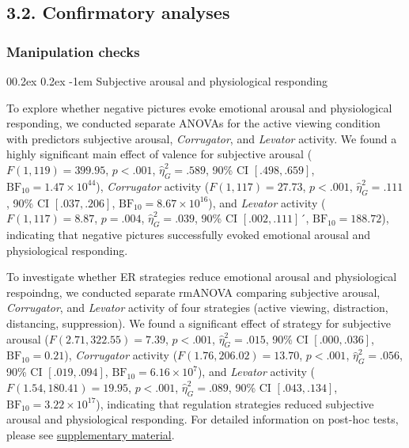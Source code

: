 \documentclass[
  man,floatsintext]{apa6}
\makeatletter
\let\oldparagraph\paragraph
\renewcommand{\paragraph}[1]{\oldparagraph{#1}\mbox{}}
\renewcommand{\paragraph}{\@startsection{paragraph}{4}{\parindent}%
  {0\baselineskip \@plus 0.2ex \@minus 0.2ex}%
  {-1em}%
  {\normalfont\normalsize\bfseries\itshape\typesectitle}}
\makeatother
\begin{document}
\hypertarget{confirmatory-analyses}{%
\subsection{3.2. Confirmatory analyses}\label{confirmatory-analyses}}

\hypertarget{manipulation-checks}{%
\subsubsection{Manipulation checks}\label{manipulation-checks}}

\hypertarget{subjective-arousal-and-physiological-responding}{%
\paragraph{Subjective arousal and physiological responding}\label{subjective-arousal-and-physiological-responding}}

To explore whether negative pictures evoke emotional arousal and physiological responding, we conducted separate ANOVAs for the active viewing condition with predictors subjective arousal, \emph{Corrugator}, and \emph{Levator} activity.
We found a highly significant main effect of valence for subjective arousal (\(F(1, 119) = 399.95\), \(p < .001\), \(\hat{\eta}^2_G = .589\), 90\% CI \([.498, .659]\), \(\mathrm{BF}_{\textrm{10}} = 1.47 \times 10^{44}\)), \emph{Corrugator} activity (\(F(1, 117) = 27.73\), \(p < .001\), \(\hat{\eta}^2_G = .111\), 90\% CI \([.037, .206]\), \(\mathrm{BF}_{\textrm{10}} = 8.67 \times 10^{16}\)), and \emph{Levator} activity (\(F(1, 117) = 8.87\), \(p = .004\), \(\hat{\eta}^2_G = .039\), 90\% CI \([.002, .111]\)´, \(\mathrm{BF}_{\textrm{10}} = 188.72\)), indicating that negative pictures successfully evoked emotional arousal and physiological responding.

To investigate whether ER strategies reduce emotional arousal and physiological respoindng, we conducted separate rmANOVA comparing subjective arousal, \emph{Corrugator}, and \emph{Levator} activity of four strategies (active viewing, distraction, distancing, suppression).
We found a significant effect of strategy for subjective arousal (\(F(2.71, 322.55) = 7.39\), \(p < .001\), \(\hat{\eta}^2_G = .015\), 90\% CI \([.000, .036]\), \(\mathrm{BF}_{\textrm{10}} = 0.21\)), \emph{Corrugator} activity (\(F(1.76, 206.02) = 13.70\), \(p < .001\), \(\hat{\eta}^2_G = .056\), 90\% CI \([.019, .094]\), \(\mathrm{BF}_{\textrm{10}} = 6.16 \times 10^{7}\)), and \emph{Levator} activity (\(F(1.54, 180.41) = 19.95\), \(p < .001\), \(\hat{\eta}^2_G = .089\), 90\% CI \([.043, .134]\), \(\mathrm{BF}_{\textrm{10}} = 3.22 \times 10^{17}\)), indicating that regulation strategies reduced subjective arousal and physiological responding.
For detailed information on post-hoc tests, please see \protect\hyperlink{SupplementEffectER}{supplementary material}.
\end{document}
